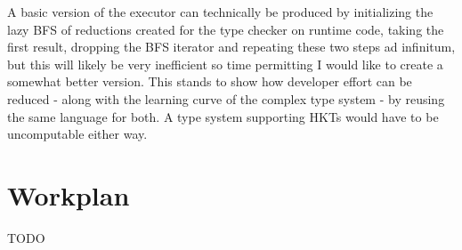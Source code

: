 \documentclass{article}
\begin{document}
A basic version of the executor can technically be produced by initializing the lazy BFS of
reductions created for the type checker on runtime code, taking the first result, dropping the
BFS iterator and repeating these two steps ad infinitum, but this will likely be very inefficient
so time permitting I would like to create a somewhat better version. This stands to show how
developer effort can be reduced - along with the learning curve of the complex type system - by
reusing the same language for both. A type system supporting HKTs would have to be uncomputable
either way.

\section{Workplan}

TODO

\appendix



\end{document}
